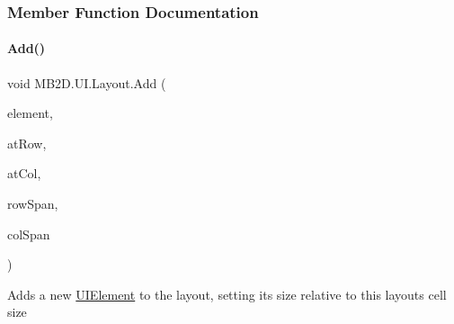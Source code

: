 \subsubsection{Member Function Documentation}
\hypertarget{class_m_b2_d_1_1_u_i_1_1_layout_aef7a54a9b1c195a99cdd83d1d526ddd4}{}\label{class_m_b2_d_1_1_u_i_1_1_layout_aef7a54a9b1c195a99cdd83d1d526ddd4} 
\paragraph{\texorpdfstring{Add()}{Add()}}
{\footnotesize\ttfamily void M\+B2\+D.\+U\+I.\+Layout.\+Add (\begin{DoxyParamCaption}\item[{\hyperlink{class_m_b2_d_1_1_u_i_1_1_u_i_element}{U\+I\+Element}}]{element,  }\item[{int}]{at\+Row,  }\item[{int}]{at\+Col,  }\item[{int}]{row\+Span,  }\item[{int}]{col\+Span }\end{DoxyParamCaption})\hspace{0.3cm}{\ttfamily [inline]}}



Adds a new \hyperlink{class_m_b2_d_1_1_u_i_1_1_u_i_element}{U\+I\+Element} to the layout, setting its size relative to this layouts cell size 


